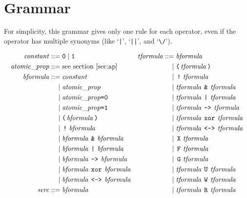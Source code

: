 \documentclass[a4paper,twoside,10pt,DIV=12]{scrreprt}
\DeclareMathOperator{\F}{\texttt{F}}
\DeclareMathOperator{\G}{\texttt{G}}
\newcommand{\U}{\mathbin{\texttt{U}}}
\newcommand{\R}{\mathbin{\texttt{R}}}
\DeclareMathOperator{\X}{\texttt{X}}
\newcommand{\W}{\mathbin{\texttt{W}}}
\DeclareMathOperator{\NOT}{\texttt{!}}
\newcommand{\XOR}{\mathbin{\texttt{xor}}}
\newcommand{\IMPLIES}{\mathbin{\texttt{->}}}
\newcommand{\EQUIV}{\mathbin{\texttt{<->}}}
\newcommand{\OR}{\mathbin{\texttt{|}}}
\newcommand{\AND}{\mathbin{\texttt{\&}}}
\newcommand{\0}{\texttt{0}}
\newcommand{\1}{\texttt{1}}
\newcommand\code[1]{\texttt{#1}}
\newcommand\samp[1]{`\texttt{#1}'}
\newcommand\tsamp[1]{\text{\texttt{#1}}}
\newcommand\msamp[1]{#1}
\begin{document}
\chapter{Grammar}

For simplicity, this grammar gives only one rule for each
operator, even if the operator has multiple synonyms (like \samp{|},
\samp{||}, and {`\verb=\/='}).

\begin{align*}
\mathit{constant} ::={}& \0 \mid \1                             & \mathit{tformula} ::={}&\mathit{bformula}\\
\mathit{atomic\_prop} ::={}& \text{see section~\ref{sec:ap}}    &   \mid{}&\tsamp{(}\,\mathit{tformula}\,\tsamp{)} \\
\mathit{bformula} ::={}& \mathit{constant}                      &   \mid{}&\msamp{\NOT}\,\mathit{tformula}\,\\
  \mid{}&\mathit{atomic\_prop}                                  &   \mid{}&\mathit{tformula}\,\msamp{\AND}\,\mathit{tformula} \\
  \mid{}&\mathit{atomic\_prop}\code{=0}                         &   \mid{}&\mathit{tformula}\,\msamp{\OR}\,\mathit{tformula} \\
  \mid{}&\mathit{atomic\_prop}\code{=1}                         &   \mid{}&\mathit{tformula}\,\msamp{\IMPLIES}\,\mathit{tformula} \\
  \mid{}&\tsamp{(}\,\mathit{bformula}\,\tsamp{)}                &   \mid{}&\mathit{tformula}\,\msamp{\XOR}\,\mathit{tformula} \\
  \mid{}&\msamp{\NOT}\,\mathit{bformula}                        &   \mid{}&\mathit{tformula}\,\msamp{\EQUIV}\,\mathit{tformula} \\
  \mid{}&\mathit{bformula}\,\msamp{\AND}\,\mathit{bformula}     &   \mid{}&\msamp{\X}\,\mathit{tformula}\\
  \mid{}&\mathit{bformula}\,\msamp{\OR}\,\mathit{bformula}      &   \mid{}&\msamp{\F}\,\mathit{tformula}\\
  \mid{}&\mathit{bformula}\,\msamp{\IMPLIES}\,\mathit{bformula} &   \mid{}&\msamp{\G}\,\mathit{tformula}\\
  \mid{}&\mathit{bformula}\,\msamp{\XOR}\,\mathit{bformula}     &   \mid{}&\mathit{tformula}\,\msamp{\U}\,\mathit{tformula} \\
  \mid{}&\mathit{bformula}\,\msamp{\EQUIV}\,\mathit{bformula}   &   \mid{}&\mathit{tformula}\,\msamp{\W}\,\mathit{tformula} \\
\mathit{sere} ::={}&\mathit{bformula}                           &   \mid{}&\mathit{tformula}\,\msamp{\R}\,\mathit{tformula} \\

\end{align*}
\end{document}
